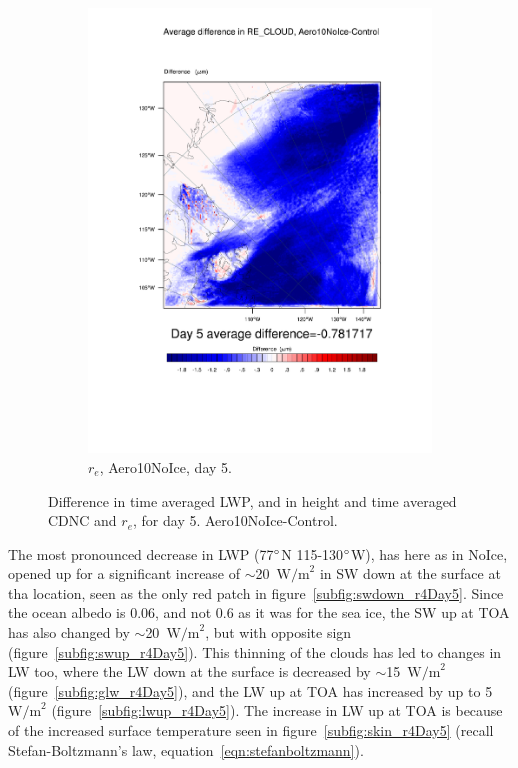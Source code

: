 \begin{figure}[hb]
	\begin{subfigure}{0.48\textwidth}
		\centering
		\includegraphics[width=\textwidth]{results/aero10ni/diff_Aero10NoIce_RE_CLOUD_Day5.pdf}
		\caption{$r_e$, Aero10NoIce, day 5.}
		\label{subfig:recloudr4Day5}
	\end{subfigure}
\caption{Difference in time averaged LWP, and in height and time averaged CDNC and $r_e$, for day 5. Aero10NoIce-Control.}
\label{fig:lwpcdncre_r4Day5}
\end{figure}

The most pronounced decrease in LWP (77$\degree$N 115-130$\degree$W), has here as in NoIce, opened up for a significant increase of $\sim$20~$\text{W/m}^2$ in SW down at the surface at tha location, seen as the only red patch in figure~\ref{subfig:swdown_r4Day5}. Since the ocean albedo is 0.06, and not 0.6 as it was for the sea ice, the SW up at TOA has also changed by $\sim$20~$\text{W/m}^2$, but with opposite sign (figure~\ref{subfig:swup_r4Day5}). This thinning of the clouds has led to changes in LW too, where the LW down at the surface is decreased by $\sim$15~$\text{W/m}^2$ (figure~\ref{subfig:glw_r4Day5}), and the LW up at TOA has increased by up to 5~$\text{W/m}^2$ (figure~\ref{subfig:lwup_r4Day5}). The increase in LW up at TOA is because of the increased surface temperature seen in figure~\ref{subfig:skin_r4Day5} (recall Stefan-Boltzmann's law, equation~\ref{eqn:stefanboltzmann}).

